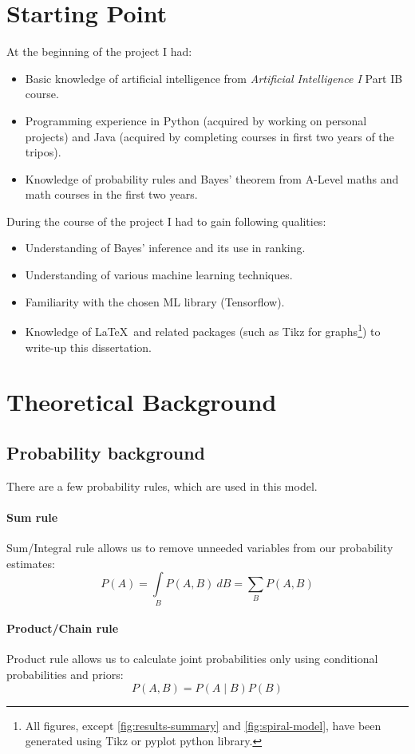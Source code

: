 \documentclass[12pt,a4paper]{book}
\begin{document}
\section{Starting Point}
\noindent
At the beginning of the project I had:
\begin{itemize}
\item Basic knowledge of artificial intelligence from \emph{Artificial Intelligence I} Part IB course.
\item Programming experience in Python (acquired by working on personal projects) and Java (acquired by completing courses in first two years of the tripos).
\item Knowledge of probability rules and Bayes' theorem from A-Level maths and math courses in the first two years.
\end{itemize}
During the course of the project I had to gain following qualities:
\begin{itemize}
\item Understanding of Bayes' inference and its use in ranking.
\item Understanding of various machine learning techniques.
\item Familiarity with the chosen ML library (Tensorflow).
\item Knowledge of \LaTeX\ and related packages (such as Tikz for graphs\footnote{All figures, except \ref{fig:results-summary} and \ref{fig:spiral-model}, have been generated using Tikz or pyplot python library.}) to write-up this dissertation.
\end{itemize}
\section{Theoretical Background}
\subsection{Probability background}
There are a few probability rules, which are used in this model.
\paragraph{Sum rule}
Sum/Integral rule allows us to remove unneeded variables from our probability estimates:
\begin{equation*}
P(A) = \int\limits_{B}P(A,B)\ dB = \sum\limits_{B}P(A,B)
\end{equation*}
\paragraph{Product/Chain rule}
Product rule allows us to calculate joint probabilities only using conditional probabilities and priors:
\begin{equation*}
P(A,B) = P(A\mid B)P(B)
\end{equation*} 
\end{document}

